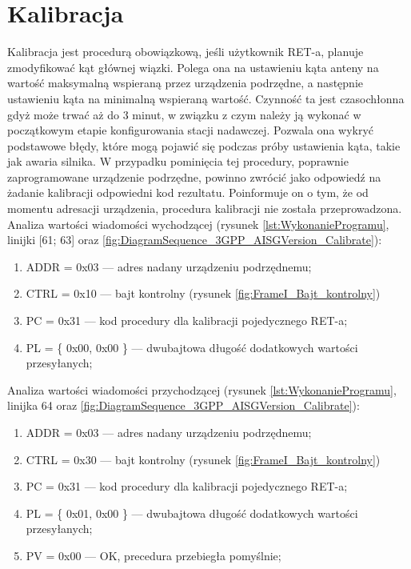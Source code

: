 \section{Kalibracja}
Kalibracja jest procedurą obowiązkową, jeśli użytkownik RET-a, planuje zmodyfikować kąt głównej wiązki. 
Polega ona na ustawieniu kąta anteny na wartość maksymalną
wspieraną przez urządzenia podrzędne, a następnie ustawieniu kąta na minimalną wspieraną wartość. 
Czynność ta jest czasochłonna gdyż może trwać aż do 3 minut, w związku z czym należy ją wykonać w początkowym
etapie konfigurowania stacji nadawczej. Pozwala ona wykryć podstawowe błędy, które mogą pojawić się podczas próby
ustawienia kąta, takie jak awaria silnika. W przypadku pominięcia tej procedury, poprawnie zaprogramowane urządzenie
podrzędne, powinno zwrócić jako odpowiedź na żadanie kalibracji odpowiedni kod rezultatu. Poinformuje on o tym, że
od momentu adresacji urządzenia, procedura kalibracji nie została przeprowadzona.
\newline\newline
Analiza wartości wiadomości wychodzącej 
(rysunek \ref{lst:WykonanieProgramu}, linijki [61; 63] oraz \ref{fig:DiagramSequence_3GPP_AISGVersion_Calibrate}):
\begin{enumerate}
    \item ADDR = 0x03 --- adres nadany urządzeniu podrzędnemu;
    \item CTRL = 0x10 --- bajt kontrolny (rysunek \ref{fig:FrameI_Bajt_kontrolny})
    \item PC = 0x31 --- kod procedury dla kalibracji pojedycznego RET-a;
    \item PL = \{ 0x00, 0x00 \} --- dwubajtowa długość dodatkowych wartości przesyłanych;
\end{enumerate}
\bigskip
Analiza wartości wiadomości przychodzącej 
(rysunek \ref{lst:WykonanieProgramu}, linijka 64 oraz \ref{fig:DiagramSequence_3GPP_AISGVersion_Calibrate}):
\begin{enumerate}
    \item ADDR = 0x03 --- adres nadany urządzeniu podrzędnemu;
    \item CTRL = 0x30 --- bajt kontrolny (rysunek \ref{fig:FrameI_Bajt_kontrolny})
    \item PC = 0x31 --- kod procedury dla kalibracji pojedycznego RET-a;
    \item PL = \{ 0x01, 0x00 \} --- dwubajtowa długość dodatkowych wartości przesyłanych;
    \item PV = 0x00 --- OK, precedura przebiegła pomyślnie;
\end{enumerate}